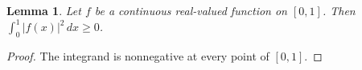 \documentclass{article}
\newtheorem{lemma}{Lemma}
\begin{document}
\begin{lemma}\label{lem:nonnegative}
Let $f$ be a continuous real-valued function on $[0,1]$. Then
$\int_0^1 |f(x)|^2\,dx\ge0$.
\end{lemma}
\begin{proof}
The integrand is nonnegative at every point of $[0,1]$.
\end{proof}
\end{document}
